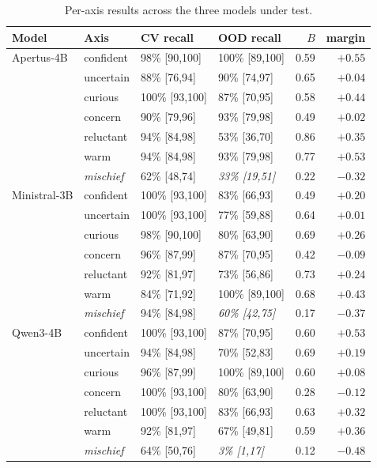 \documentclass[11pt]{article}
\begin{document}
\begin{table}[htbp]
\centering
\small
\begin{tabular}{llllrr}
\toprule
Model & Axis & CV recall & OOD recall & $B$ & margin \\
\midrule
Apertus-4B & confident & 98\% [90,100] & 100\% [89,100] & 0.59 & $+0.55$ \\
 & uncertain & 88\% [76,94] & 90\% [74,97] & 0.65 & $+0.04$ \\
 & curious & 100\% [93,100] & 87\% [70,95] & 0.58 & $+0.44$ \\
 & concern & 90\% [79,96] & 93\% [79,98] & 0.49 & $+0.02$ \\
 & reluctant & 94\% [84,98] & 53\% [36,70] & 0.86 & $+0.35$ \\
 & warm & 94\% [84,98] & 93\% [79,98] & 0.77 & $+0.53$ \\
 & \emph{mischief} & 62\% [48,74] & \emph{33\% [19,51]} & 0.22 & $-0.32$ \\
\midrule
Ministral-3B & confident & 100\% [93,100] & 83\% [66,93] & 0.49 & $+0.20$ \\
 & uncertain & 100\% [93,100] & 77\% [59,88] & 0.64 & $+0.01$ \\
 & curious & 98\% [90,100] & 80\% [63,90] & 0.69 & $+0.26$ \\
 & concern & 96\% [87,99] & 87\% [70,95] & 0.42 & $-0.09$ \\
 & reluctant & 92\% [81,97] & 73\% [56,86] & 0.73 & $+0.24$ \\
 & warm & 84\% [71,92] & 100\% [89,100] & 0.68 & $+0.43$ \\
 & \emph{mischief} & 94\% [84,98] & \emph{60\% [42,75]} & 0.17 & $-0.37$ \\
\midrule
Qwen3-4B & confident & 100\% [93,100] & 87\% [70,95] & 0.60 & $+0.53$ \\
 & uncertain & 94\% [84,98] & 70\% [52,83] & 0.69 & $+0.19$ \\
 & curious & 96\% [87,99] & 100\% [89,100] & 0.60 & $+0.08$ \\
 & concern & 100\% [93,100] & 80\% [63,90] & 0.28 & $-0.12$ \\
 & reluctant & 100\% [93,100] & 83\% [66,93] & 0.63 & $+0.32$ \\
 & warm & 92\% [81,97] & 67\% [49,81] & 0.59 & $+0.36$ \\
 & \emph{mischief} & 64\% [50,76] & \emph{3\% [1,17]} & 0.12 & $-0.48$ \\
\bottomrule
\end{tabular}
\caption{Per-axis results across the three models under test.}
\label{tab:peraxis}
\end{table}
\end{document}
